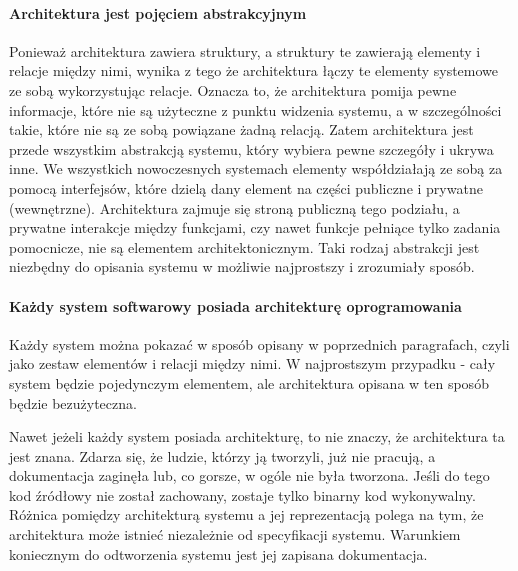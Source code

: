 \paragraph{Architektura jest pojęciem abstrakcyjnym}
Ponieważ architektura zawiera struktury, a struktury te zawierają elementy i relacje między nimi, wynika z tego że architektura łączy te elementy systemowe ze sobą wykorzystując relacje. Oznacza to, że architektura pomija pewne informacje, które nie są użyteczne z punktu widzenia systemu, a w szczególności takie, które nie są ze sobą powiązane żadną relacją. Zatem architektura jest przede wszystkim abstrakcją systemu, który wybiera pewne szczegóły i ukrywa inne. We wszystkich nowoczesnych systemach elementy współdziałają ze sobą za pomocą interfejsów, które dzielą dany element na części publiczne i prywatne (wewnętrzne). Architektura zajmuje się stroną publiczną tego podziału, a prywatne interakcje między funkcjami, czy nawet funkcje pełniące tylko zadania pomocnicze, nie są elementem architektonicznym. Taki rodzaj abstrakcji jest niezbędny do opisania systemu w możliwie najprostszy i zrozumiały sposób.

\paragraph{Każdy system softwarowy posiada architekturę oprogramowania}
Każdy system można pokazać w sposób opisany w poprzednich paragrafach, czyli jako zestaw elementów i relacji między nimi. W najprostszym przypadku - cały system będzie pojedynczym elementem, ale architektura opisana w ten sposób będzie bezużyteczna.

Nawet jeżeli każdy system posiada architekturę, to nie znaczy, że architektura ta jest znana. Zdarza się, że ludzie, którzy ją tworzyli, już nie pracują, a dokumentacja zaginęła lub, co gorsze, w ogóle nie była tworzona. Jeśli do tego kod źródłowy nie został zachowany, zostaje tylko binarny kod wykonywalny.
Różnica pomiędzy architekturą systemu a jej reprezentacją polega na tym, że architektura może istnieć niezależnie od specyfikacji systemu.  Warunkiem koniecznym do odtworzenia systemu jest jej zapisana dokumentacja.

